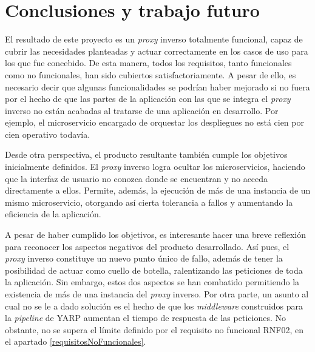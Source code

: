 \documentclass[11pt,spanish,listoffigures]{tfgetsinf}
\begin{document}

\chapter{Conclusiones y trabajo futuro}

El resultado de este proyecto es un \emph{proxy} inverso totalmente funcional, capaz de cubrir las
necesidades planteadas y actuar correctamente en los casos de uso para los que fue concebido. De esta manera, todos los requisitos, tanto funcionales como no funcionales, han sido cubiertos satisfactoriamente. A pesar de ello, es necesario decir que algunas funcionalidades se podrían haber mejorado si no fuera por el hecho de que las partes de la aplicación con las que se integra el \emph{proxy} inverso no están acabadas al tratarse de una aplicación en desarrollo. Por ejemplo, el microservicio encargado de orquestar los despliegues no está cien por cien operativo todavía.

Desde otra perspectiva, el producto resultante también cumple los objetivos inicialmente definidos. El \emph{proxy} inverso logra ocultar los microservicios, haciendo que la interfaz de usuario no conozca donde se encuentran y no acceda directamente a ellos. Permite, además, la ejecución de más de una instancia de un mismo microservicio, otorgando así cierta tolerancia a fallos y aumentando la eficiencia de la aplicación.

A pesar de haber cumplido los objetivos, es interesante hacer una breve reflexión para reconocer los aspectos negativos del producto desarrollado. Así pues, el \emph{proxy} inverso constituye un nuevo punto único de fallo, además de tener la posibilidad de actuar como cuello de botella, ralentizando las peticiones de toda la aplicación. Sin embargo, estos dos aspectos se han combatido permitiendo la existencia de más de una instancia del \emph{proxy} inverso. Por otra parte, un asunto al cual no se le a dado solución es el hecho de que los \emph{middleware} construidos para la \emph{pipeline} de YARP aumentan el tiempo de respuesta de las peticiones. No obstante, no se supera el límite definido por el requisito no funcional RNF02, en el apartado \ref{requisitosNoFuncionales}.
\end{document}
